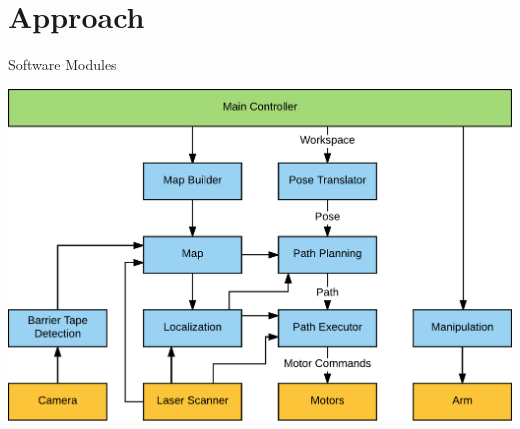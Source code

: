 
\section{Approach}
\begin{frame}{Software Modules}
    \begin{center}
        \includegraphics[width=\linewidth,height=0.9\textheight,keepaspectratio]{gfx/software_modules.pdf}
    \end{center}
\end{frame}